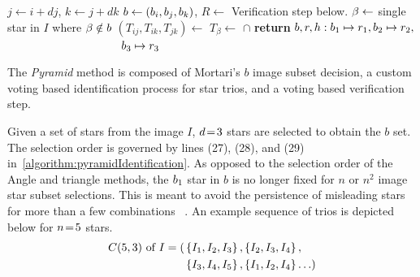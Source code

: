\documentclass[conference]{IEEEtran}
\begin{document}
\begin{algorithm}
\begin{algorithmic}[1]
            \State $j \gets i + dj$, $k \gets j + dk$
            \State $b \gets \left(b_i, b_j, b_k\right)$, $R \gets $
            \LineComment Verification step below.
            \State $\beta \gets $ single star in $I$ where $\beta \notin b$
            \State $(T_{ij}, T_{ik}, T_{jk}) \gets$ 
            \State $T_\beta \gets $  $\cap$ 
            \State \textbf{return} $b, r, h: b_1 \mapsto r_1, b_2 \mapsto r_2,$
            \State \ \ \ \ \ \ \ \ \ \ \ \ \ \ \ \ \ \ \ \ $b_3 \mapsto r_3$
            \EndIf
            \EndIf
            \EndFor
            \EndFor
            \EndFor
            \EndFunction
        \end{algorithmic}
    \end{algorithm}

    The \textit{Pyramid} method is composed of Mortari's $b$ image subset decision, a custom voting based identification
    process for star trios, and a voting based verification step.

    Given a set of stars from the image $I$, $d \!=\! 3$ stars are selected to obtain the $b$ set.
    The selection order is governed by lines (27), (28), and (29) in~\autoref{algorithm:pyramidIdentification}.
    As opposed to the selection order of the Angle and triangle methods, the $b_1$ star in $b$ is no longer fixed
    for $n$ or $n^2$ image star subset selections.
    This is meant to avoid the persistence of misleading stars for more than a few combinations
    ~\cite{mortari:pyramidIdentification}.
    An example sequence of trios is depicted below for $n \!=\! 5$ stars.
    \begin{equation}
        \begin{aligned}
            C(5, 3) \text{ of } I = ( &\left\{ I_1, I_2, I_3 \right\}, \left\{ I_2, I_3, I_4 \right\}, \\
            &\left\{ I_3, I_4, I_5 \right\}, \left\{ I_1, I_2, I_4  \right\}\ldots )
        \end{aligned}
    \end{equation}
\end{document}

